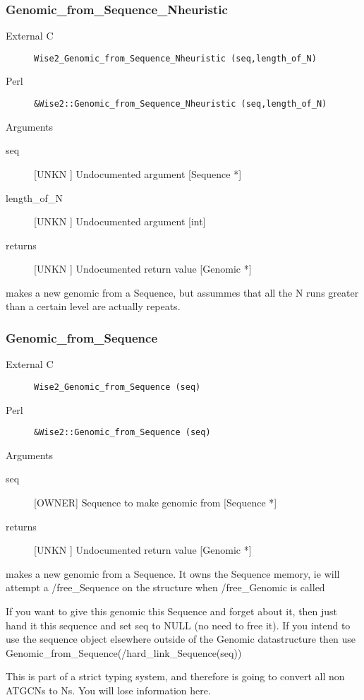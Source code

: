 \subsubsection{Genomic_from_Sequence_Nheuristic}
\begin{description}
\item[External C] {\tt Wise2_Genomic_from_Sequence_Nheuristic (seq,length_of_N)}
\item[Perl] {\tt &Wise2::Genomic_from_Sequence_Nheuristic (seq,length_of_N)}

\end{description}
Arguments
\begin{description}
\item[seq] [UNKN ] Undocumented argument [Sequence *]
\item[length_of_N] [UNKN ] Undocumented argument [int]
\item[returns] [UNKN ] Undocumented return value [Genomic *]
\end{description}
makes a new genomic from a Sequence, but
assummes that all the N runs greater than
a certain level are actually repeats.


\subsubsection{Genomic_from_Sequence}
\begin{description}
\item[External C] {\tt Wise2_Genomic_from_Sequence (seq)}
\item[Perl] {\tt &Wise2::Genomic_from_Sequence (seq)}

\end{description}
Arguments
\begin{description}
\item[seq] [OWNER] Sequence to make genomic from [Sequence *]
\item[returns] [UNKN ] Undocumented return value [Genomic *]
\end{description}
makes a new genomic from a Sequence. It 
owns the Sequence memory, ie will attempt a /free_Sequence
on the structure when /free_Genomic is called


If you want to give this genomic this Sequence and
forget about it, then just hand it this sequence and set
seq to NULL (no need to free it). If you intend to use 
the sequence object elsewhere outside of the Genomic datastructure
then use Genomic_from_Sequence(/hard_link_Sequence(seq))


This is part of a strict typing system, and therefore
is going to convert all non ATGCNs to Ns. You will lose
information here.




